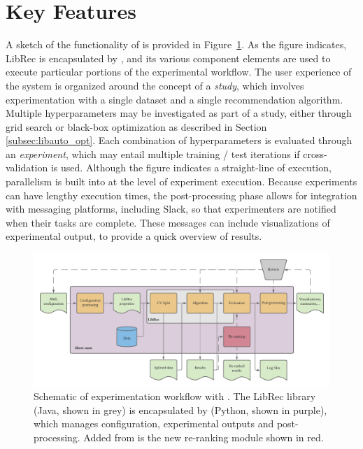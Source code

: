 \section{Key Features}
\label{sec:libauto_keyfeatures}

A sketch of the functionality of \libauto{} is provided in Figure~\ref{fig:librec-auto}. As the figure indicates, LibRec is encapsulated by \libauto{}, and its various component elements are used to execute particular portions of the experimental workflow. The user experience of the system is organized around the concept of a \textit{study}, which involves experimentation with a single dataset and a single recommendation algorithm. Multiple hyperparameters may be investigated as part of a study, either through grid search or black-box optimization as described in Section \ref{subsec:libauto_opt}. Each combination of hyperparameters is evaluated through an \textit{experiment}, which may entail multiple training / test iterations if cross-validation is used. Although the figure indicates a straight-line of execution, parallelism is built into \libauto{} at the level of experiment execution. Because experiments can have lengthy execution times, the post-processing phase allows for integration with messaging platforms, including Slack, so that experimenters are notified when their tasks are complete. These messages can include visualizations of experimental output, to provide a quick overview of results.

\begin{figure}[!htb]
    \centering
    \includegraphics[width=0.95\linewidth]{imgs/la/workflow.pdf}
    \caption{Schematic of experimentation workflow with \libauto{}. The LibRec library (Java, shown in grey) is encapsulated by \libauto{} (Python, shown in purple), which manages configuration, experimental outputs and post-processing. Added from \cite{mansoury2018automating} is the new re-ranking module shown in red.}
    \label{fig:librec-auto}
    \vspace{-0.15in}
\end{figure}

